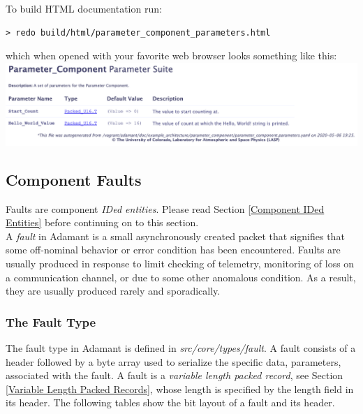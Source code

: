 To build HTML documentation run:

\vspace{5mm} %
\begin{verbatim}
> redo build/html/parameter_component_parameters.html
\end{verbatim}
\vspace{5mm} %

which when opened with your favorite web browser looks something like this: \\

\vspace{5mm} %
\includegraphics[width=\textwidth]{images/parametershtml.png}
\vspace{5mm} %

\subsection{Component Faults}

Faults are component \textit{IDed entities}. Please read Section \ref{Component IDed Entities} before continuing on to this section. \\

A \textit{fault} in Adamant is a small asynchronously created packet that signifies that some off-nominal behavior or error condition has been encountered. Faults are usually produced in response to limit checking of telemetry, monitoring of loss on a communication channel, or due to some other anomalous condition. As a result, they are usually produced rarely and sporadically.

\subsubsection{The Fault Type}

The fault type in Adamant is defined in \textit{src/core/types/fault}. A fault consists of a header followed by a byte array used to serialize the specific data, parameters, associated with the fault. A fault is a \textit{variable length packed record}, see Section \ref{Variable Length Packed Records}, whose length is specified by the length field in its header. The following tables show the bit layout of a fault and its header. \\

